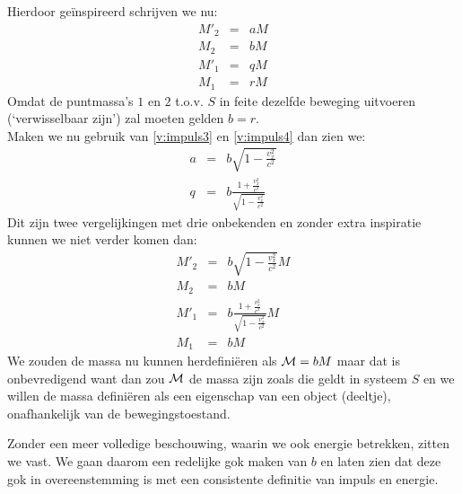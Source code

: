 Hierdoor ge\"{i}nspireerd schrijven we nu:
\begin{eqnarray*}
M'_{2} & = & aM \\
M_{2} & = & bM \\
M'_{1} & = & qM \\
M_{1} & = & rM
\end{eqnarray*}
Omdat de puntmassa's $1$ en $2$ t.o.v. $S$ in feite dezelfde beweging uitvoeren
(`verwisselbaar zijn') zal moeten gelden $b = r$.\\
Maken we nu gebruik van \ref{v:impuls3} en \ref{v:impuls4}
dan zien we:
\begin{eqnarray*}
a & = & b\sqrt{1 - \frac{v^{2}_{x}}{c^{2}}} \\
q & = & b\frac{1 + \frac{v^{2}_x}{c^{2}}}{\sqrt{1 - \frac{v^{2}_{x}}{c^{2}}}}
\end{eqnarray*}
Dit zijn twee vergelijkingen met drie onbekenden en zonder extra inspiratie
kunnen we niet verder komen dan:
\begin{eqnarray*}
M'_{2} & = & b \sqrt{1 - \frac{v^{2}_{x}}{c^{2}}} M \\
M_{2} & = & bM \\
M'_{1} & = & b\frac{1 + \frac{v^{2}_x} {c^{2}} }
{\sqrt{1 - \frac{v^{2}_{x}} {c^{2}} } } M \\
M_{1} & = & bM
\end{eqnarray*}
We zouden de massa nu kunnen herdefini\"{e}ren als ${\cal M} = bM$ maar dat is 
onbevredigend want dan zou $\cal M$ de massa zijn zoals die geldt in
systeem $S$ en we willen de massa defini\"{e}ren als een eigenschap
van een object (deeltje),
onafhankelijk van de bewegingstoestand.

Zonder een meer volledige beschouwing, waarin we ook energie betrekken, 
zitten we vast.
We gaan daarom een redelijke gok maken van $b$ en laten zien dat deze gok 
in overeenstemming is met een consistente definitie van impuls en energie. 

